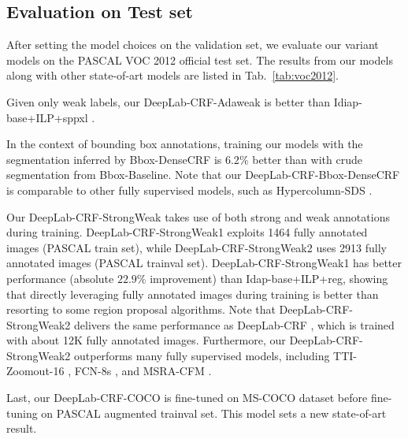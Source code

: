 \subsection{Evaluation on Test set}
After setting the model choices on the validation set, we evaluate our variant models on the PASCAL VOC 2012 official test set. The results from our models along with other state-of-art models are listed in Tab.~\ref{tab:voc2012}. 

Given only weak labels, our DeepLab-CRF-Adaweak is better than Idiap-base+ILP+sppxl \citep{pinheiro2014weakly}. 

In the context of bounding box annotations, training our models with the segmentation inferred by Bbox-DenseCRF is $6.2\%$ better than with crude segmentation from Bbox-Baseline. Note that our DeepLab-CRF-Bbox-DenseCRF is comparable to other fully supervised models, such as Hypercolumn-SDS \citep{hariharan2014hypercolumns}.

Our DeepLab-CRF-StrongWeak takes use of both strong and weak annotations during training. DeepLab-CRF-StrongWeak1 exploits 1464 fully annotated images (PASCAL train set), while DeepLab-CRF-StrongWeak2 uses 2913 fully annotated images (PASCAL trainval set). DeepLab-CRF-StrongWeak1 has better performance (absolute $22.9\%$ improvement) than Idap-base+ILP+reg, showing that directly leveraging fully annotated images during training is better than resorting to some region proposal algorithms. Note that DeepLab-CRF-StrongWeak2 delivers the same performance as DeepLab-CRF \citep{chen2014semantic}, which is trained with about 12K fully annotated images. Furthermore, our DeepLab-CRF-StrongWeak2 outperforms many fully supervised models, including TTI-Zoomout-16 \citep{mostajabi2014feedforward}, FCN-8s \citep{long2014fully}, and MSRA-CFM \citep{dai2014convolutional}.

Last, our DeepLab-CRF-COCO is fine-tuned on MS-COCO dataset before fine-tuning on PASCAL augmented trainval set. This model sets a new state-of-art result.



